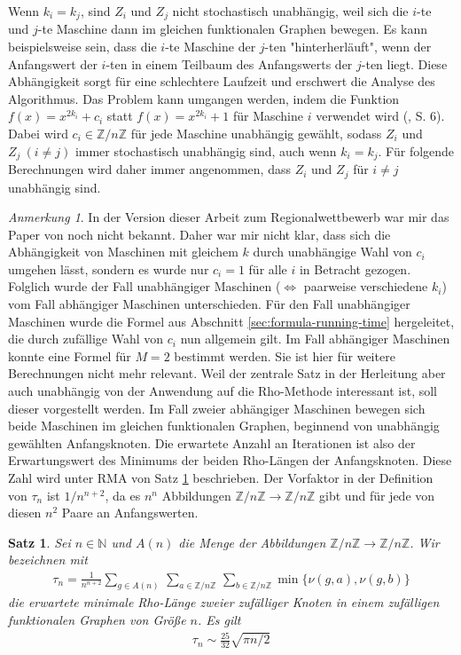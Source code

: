\documentclass[a4paper, 11pt, ngerman]{article}
\newcommand{\N}{\mathbb{N}}
\newcommand{\Z}{\mathbb{Z}}
\theoremstyle{definition}
\theoremstyle{plain}
\newtheorem{theorem}{Satz}
\theoremstyle{remark}
\newtheorem*{remark*}{Anmerkung}
\begin{document}
Wenn $k_i = k_j$, sind $Z_i$ und $Z_j$ nicht stochastisch unabhängig, weil sich die $i$-te und $j$-te Maschine dann im gleichen funktionalen Graphen bewegen. Es kann beispielsweise sein, dass die $i$-te Maschine der $j$-ten "hinterherläuft", wenn der Anfangswert der $i$-ten in einem Teilbaum des Anfangswerts der $j$-ten liegt. Diese Abhängigkeit sorgt für eine schlechtere Laufzeit und erschwert die Analyse des Algorithmus. Das Problem kann umgangen werden, indem die Funktion $f(x) = x^{2k_i} + c_i$ statt $f(x) = x^{2k_i} + 1$ für Maschine $i$ verwendet wird (\cite{cr99}, S. 6). Dabei wird $c_i \in \Z/n\Z$ für jede Maschine unabhängig gewählt, sodass $Z_i$ und $Z_j \ (i \ne j)$ immer stochastisch unabhängig sind, auch wenn $k_i = k_j$. Für folgende Berechnungen wird daher immer angenommen, dass $Z_i$ und $Z_j$ für $i \ne j$ unabhängig sind.

\begin{remark*}
    In der Version dieser Arbeit zum Regionalwettbewerb war mir das Paper von \cite{cr99} noch nicht bekannt. Daher war mir nicht klar, dass sich die Abhängigkeit von Maschinen mit gleichem $k$ durch unabhängige Wahl von $c_i$ umgehen lässt, sondern es wurde nur $c_i = 1$ für alle $i$ in Betracht gezogen. Folglich wurde der Fall unabhängiger Maschinen ($\Longleftrightarrow$ paarweise verschiedene $k_i$) vom Fall abhängiger Maschinen unterschieden. Für den Fall unabhängiger Maschinen wurde die Formel aus Abschnitt \ref{sec:formula-running-time} hergeleitet, die durch zufällige Wahl von $c_i$ nun allgemein gilt. Im Fall abhängiger Maschinen konnte eine Formel für $M = 2$ bestimmt werden. Sie ist hier für weitere Berechnungen nicht mehr relevant. Weil der zentrale Satz in der Herleitung aber auch unabhängig von der Anwendung auf die Rho-Methode interessant ist, soll dieser vorgestellt werden. Im Fall zweier abhängiger Maschinen bewegen sich beide Maschinen im gleichen funktionalen Graphen, beginnend von unabhängig gewählten Anfangsknoten. Die erwartete Anzahl an Iterationen ist also der Erwartungswert des Minimums der beiden Rho-Längen der Anfangsknoten. Diese Zahl wird unter RMA von Satz \ref{theorem:min-rho-len-m2} beschrieben. Der Vorfaktor in der Definition von $\tau_n$ ist $1/n^{n + 2}$, da es $n^n$ Abbildungen $\Z/n\Z \to \Z/n\Z$ gibt und für jede von diesen $n^2$ Paare an Anfangswerten.
\end{remark*}

\begin{theorem}
    \label{theorem:min-rho-len-m2}
    Sei $n \in \N$ und $A(n)$ die Menge der Abbildungen $\Z/n\Z \to \Z/n\Z$. Wir bezeichnen mit
    \begin{align*}
        \tau_n =  \frac 1 {n^{n + 2}}
        \sum_{g \in A(n)} \, \sum_{a \in \Z/n\Z} \, \sum_{b \in \Z/n\Z}
        \min\{\nu(g, a), \nu(g, b)\}
    \end{align*}
    die erwartete minimale Rho-Länge zweier zufälliger Knoten in einem zufälligen funktionalen Graphen von Größe $n$.  Es gilt
    \begin{align*}
        \tau_n \sim \frac {25} {32} \sqrt{\pi n / 2}
    \end{align*}
\end{theorem}
\end{document}
